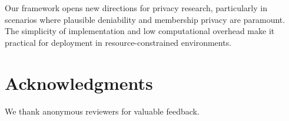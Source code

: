 \documentclass[11pt]{article}
\begin{document}
Our framework opens new directions for privacy research, particularly in scenarios where plausible deniability and membership privacy are paramount. The simplicity of implementation and low computational overhead make it practical for deployment in resource-constrained environments.

\section*{Acknowledgments}
We thank anonymous reviewers for valuable feedback.



\end{document}
